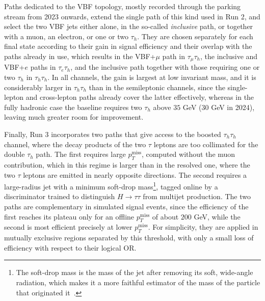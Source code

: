 Paths dedicated to the VBF topology, mostly recorded through the parking stream from 2023 onwards, extend the single path of this kind used in Run 2, and select the two VBF jets either alone, in the so-called \textit{inclusive} path, or together with a muon, an electron, or one or two $\tau_h$. They are chosen separately for each final state according to their gain in signal efficiency and their overlap with the paths already in use, which results in the VBF+$\mu$ path in $\tau_\mu\tau_h$, the inclusive and VBF+$e$ paths in $\tau_e\tau_h$, and the inclusive path together with those requiring one or two $\tau_h$ in $\tau_h\tau_h$. In all channels, the gain is largest at low invariant mass, and it is considerably larger in $\tau_h\tau_h$ than in the semileptonic channels, since the single-lepton and cross-lepton paths already cover the latter effectively, whereas in the fully hadronic case the baseline requires two $\tau_h$ above $35$ GeV ($30$ GeV in 2024), leaving much greater room for improvement.\medskip




Finally, Run 3 incorporates two paths that give access to the boosted $\tau_h\tau_h$ channel, where the decay products of the two $\tau$ leptons are too collimated for the double $\tau_h$ path. The first requires large $p_T^\text{miss}$, computed without the muon contribution, which in this regime is larger than in the resolved one, where the two $\tau$ leptons are emitted in nearly opposite directions. The second requires a large-radius jet with a minimum soft-drop mass\footnote{The soft-drop mass is the mass of the jet after removing its soft, wide-angle radiation, which makes it a more faithful estimator of the mass of the particle that originated it~\cite{Larkoski:2014wba}.}, tagged online by a discriminator trained to distinguish $H \to \tau\tau$ from multijet production. The two paths are complementary in simulated signal events, since the efficiency of the first reaches its plateau only for an offline $p_T^\text{miss}$ of about $200$ GeV, while the second is most efficient precisely at lower $p_T^\text{miss}$. For simplicity, they are applied in mutually exclusive regions separated by this threshold, with only a small loss of efficiency with respect to their logical OR.





